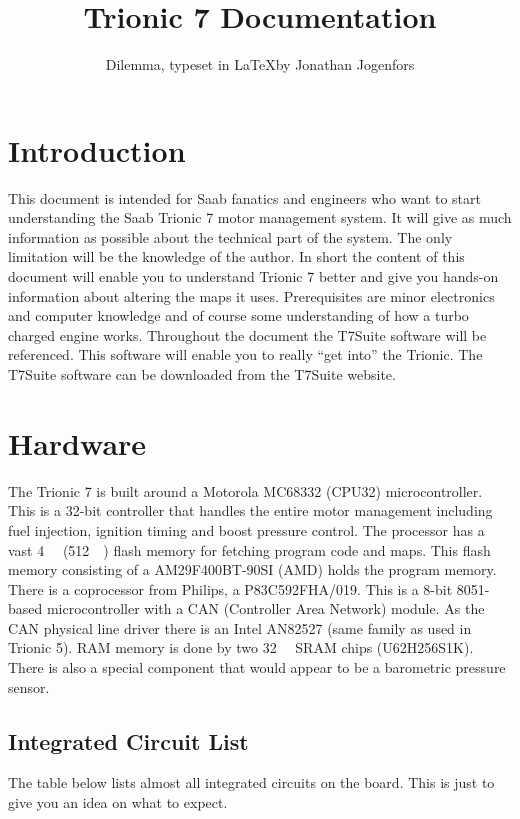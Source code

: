 \documentclass[11pt,a4paper]{book}
\begin{document}
\title{Trionic 7 Documentation}
\author{Dilemma, typeset in \LaTeX by Jonathan Jogenfors}

\maketitle
\clearpage
\listoftodos
\chapter{Introduction}
This document is intended for Saab fanatics and engineers who want to start
understanding the Saab Trionic 7 motor management system. It will give as much
information as possible about the technical part of the system. The only
limitation will be the knowledge of the author. In short the content of this
document will enable you to understand Trionic 7 better and give you hands-on
information about altering the maps it uses. Prerequisites are minor electronics
and computer knowledge and of course some understanding of how a turbo charged
engine works. Throughout the document the T7Suite software will be referenced.
This software will enable you to really \enquote{get into} the Trionic. The T7Suite
software can be downloaded from the T7Suite website.


\tableofcontents

\chapter{Hardware}
The Trionic 7 is built around a Motorola MC68332 (CPU32) microcontroller. This
is a 32-bit controller that handles the entire motor management including fuel
injection, ignition timing and boost pressure control. The processor has a vast
\SI{4}{\mega\byte} (\SI{512}{\kilo\byte}) flash memory for fetching program code
and maps. This flash memory consisting of a AM29F400BT-90SI (AMD) holds the
program memory. There is a coprocessor from Philips, a P83C592FHA/019. This is a
8-bit 8051-based microcontroller with a CAN (Controller Area Network) module. As
the CAN physical line driver there is an Intel AN82527 (same family as used in
Trionic 5). RAM memory is done by two \SI{32}{\kilo\bit} SRAM chips
(U62H256S1K). There is also a special component that would appear to be a
barometric pressure sensor.

\section{Integrated Circuit List}
The table below lists almost all integrated circuits on the board. This is just to give you an idea on what to expect.
\end{document}
